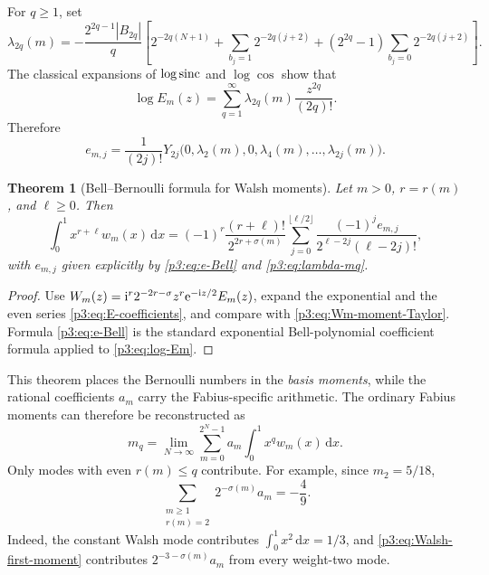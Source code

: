 \documentclass[11pt]{article}
\newtheorem{theorem}{Theorem}[section]
\theoremstyle{definition}
\theoremstyle{remark}
\newcommand{\dd}{\,\mathrm d}
\begin{document}
For $q\ge1$, set
\begin{equation}\label{p3:eq:lambda-mq}
 \lambda_{2q}(m)
 =-\frac{2^{2q-1}|B_{2q}|}{q}
 \left[
  2^{-2q(N+1)}
  +\sum_{b_j=1}2^{-2q(j+2)}
  +(2^{2q}-1)\sum_{b_j=0}2^{-2q(j+2)}
 \right].
\end{equation}
The classical expansions of $\log\operatorname{sinc}$ and $\log\cos$ show that
\begin{equation}\label{p3:eq:log-Em}
 \log E_m(z)=\sum_{q=1}^\infty
 \lambda_{2q}(m)\frac{z^{2q}}{(2q)!}.
\end{equation}
Therefore
\begin{equation}\label{p3:eq:e-Bell}
 e_{m,j}=\frac1{(2j)!}
 Y_{2j}\bigl(0,\lambda_2(m),0,\lambda_4(m),\ldots,
              \lambda_{2j}(m)\bigr).
\end{equation}

\begin{theorem}[Bell--Bernoulli formula for Walsh moments]
\label{p3:thm:Walsh-Bell-moments}
Let $m>0$, $r=r(m)$, and $\ell\ge0$.  Then
\begin{equation}\label{p3:eq:Walsh-higher-moments}
 \int_0^1x^{r+\ell}w_m(x)\dd x
 =(-1)^r\frac{(r+\ell)!}{2^{2r+\sigma(m)}}
 \sum_{j=0}^{\lfloor\ell/2\rfloor}
 \frac{(-1)^je_{m,j}}
      {2^{\ell-2j}(\ell-2j)!},
\end{equation}
with $e_{m,j}$ given explicitly by \eqref{p3:eq:e-Bell} and
\eqref{p3:eq:lambda-mq}.
\end{theorem}

\begin{proof}
Use
$W_m(z)=\mathrm i^r2^{-2r-\sigma}z^r\mathrm e^{-\mathrm i z/2}E_m(z)$,
expand the exponential and the even series \eqref{p3:eq:E-coefficients}, and
compare with \eqref{p3:eq:Wm-moment-Taylor}.  Formula \eqref{p3:eq:e-Bell} is the
standard exponential Bell-polynomial coefficient formula applied to
\eqref{p3:eq:log-Em}.
\end{proof}

This theorem places the Bernoulli numbers in the \emph{basis moments}, while
the rational coefficients $a_m$ carry the Fabius-specific arithmetic.  The
ordinary Fabius moments can therefore be reconstructed as
\begin{equation}\label{p3:eq:Fabius-moment-Walsh}
 m_q=\lim_{N\to\infty}
 \sum_{m=0}^{2^N-1}a_m\int_0^1x^qw_m(x)\dd x.
\end{equation}
Only modes with even $r(m)\le q$ contribute.  For example, since
$m_2=5/18$,
\begin{equation}\label{p3:eq:weight-two-sum-rule}
 \sum_{\substack{m\ge1\\r(m)=2}}
 2^{-\sigma(m)}a_m=-\frac49.
\end{equation}
Indeed, the constant Walsh mode contributes $\int_0^1x^2\dd x=1/3$, and
\eqref{p3:eq:Walsh-first-moment} contributes
$2^{-3-\sigma(m)}a_m$ from every weight-two mode.
\end{document}
